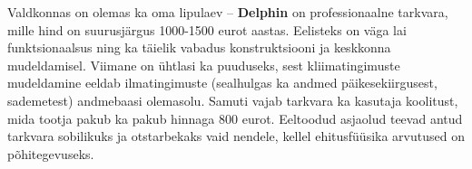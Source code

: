 Valdkonnas on olemas ka oma lipulaev -- \textbf{Delphin} on professionaalne tarkvara, mille hind on suurusjärgus 1000-1500 eurot aastas.
Eelisteks on väga lai funktsionaalsus ning ka täielik vabadus konstruktsiooni ja keskkonna mudeldamisel. Viimane on ühtlasi ka puuduseks,
sest kliimatingimuste mudeldamine eeldab ilmatingimuste (sealhulgas ka andmed päikesekiirgusest, sademetest) andmebaasi olemasolu.
Samuti vajab tarkvara ka kasutaja koolitust, mida tootja pakub ka pakub hinnaga 800 eurot. Eeltoodud asjaolud teevad antud tarkvara 
sobilikuks ja otstarbekaks vaid nendele, kellel ehitusfüüsika arvutused on põhitegevuseks.
